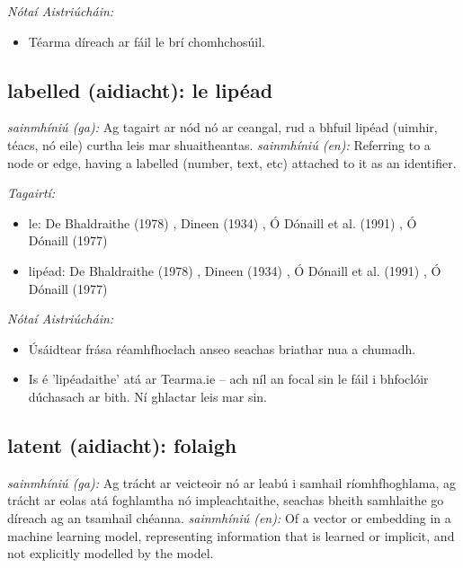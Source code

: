 \documentclass{article}
\begin{document}
 \noindent \textit{Nótaí Aistriúcháin:}
\begin{itemize}
	\item Téarma díreach ar fáil le brí chomhchosúil.
\end{itemize}


\subsection*{labelled (aidiacht): le lipéad} 
 \noindent \textit{sainmhíniú (ga):} Ag tagairt ar nód nó ar ceangal, rud a bhfuil lipéad (uimhir, téacs, nó eile) curtha leis mar shuaitheantas.
\newline\newline
 \noindent \textit{sainmhíniú (en):} Referring to a node or edge, having a labelled (number, text, etc) attached to it as an identifier.
\newline

 \noindent \textit{Tagairtí:}
\begin{itemize}
	\item le: De Bhaldraithe (1978) \cite{de-bhaldraithe}, Dineen (1934) \cite{dineen}, Ó Dónaill et al. (1991) \cite{focloir-beag}, Ó Dónaill (1977) \cite{odonaill}
	\item lipéad: De Bhaldraithe (1978) \cite{de-bhaldraithe}, Dineen (1934) \cite{dineen}, Ó Dónaill et al. (1991) \cite{focloir-beag}, Ó Dónaill (1977) \cite{odonaill}
\end{itemize}

 \noindent \textit{Nótaí Aistriúcháin:}
\begin{itemize}
	\item Úsáidtear frása réamhfhoclach anseo seachas briathar nua a chumadh.
	\item Is é 'lipéadaithe' atá ar Tearma.ie -- ach níl an focal sin le fáil i bhfoclóir dúchasach ar bith. Ní ghlactar leis mar sin.
\end{itemize}


\subsection*{latent (aidiacht): folaigh} 
 \noindent \textit{sainmhíniú (ga):} Ag trácht ar veicteoir nó ar leabú i samhail ríomhfhoghlama, ag trácht ar eolas atá foghlamtha nó impleachtaithe, seachas bheith samhlaithe go díreach ag an tsamhail chéanna.
\newline\newline
 \noindent \textit{sainmhíniú (en):} Of a vector or embedding in a machine learning model, representing information that is learned or implicit, and not explicitly modelled by the model.
\newline
\end{document}
